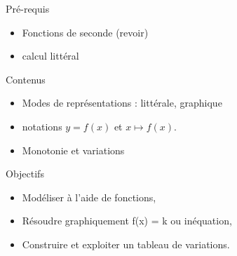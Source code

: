 \documentclass{article}
\theoremstyle{definition}
\begin{document}
\pagestyle{fancy}

\fancyhf{} %
\fancyhead[L]{\large \textbf{\Niveau}}
\fancyhead[C]{\large \textbf{\Chapitre}}

\large

\begin{paragraph}{Pré-requis}
  \begin{itemize}
    \item Fonctions de seconde (revoir)
    \item calcul littéral
  \end{itemize}
\end{paragraph}

\begin{paragraph}{Contenus}
  \begin{itemize}
    \item Modes de représentations : littérale, graphique
    \item notations $y = f(x)$ et $x \mapsto f(x)$.
    \item Monotonie et variations
  \end{itemize}
\end{paragraph}

\begin{paragraph}{Objectifs}
  \begin{itemize}
    \item Modéliser à l'aide de fonctions,
    \item Résoudre graphiquement f(x) = k ou inéquation,
    \item Construire et exploiter un tableau de variations.
  \end{itemize} 
\end{paragraph}
\end{document}
